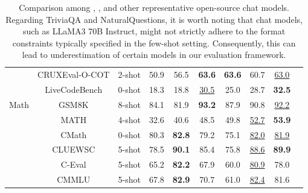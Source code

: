 \begin{table}[!t]
\begin{tabular}{@{}c c l c | cc c |c c c@{}}
    & CRUXEval-O-COT & 2-shot & 50.9 & 56.5 & \textbf{63.6} & \textbf{63.6} & 60.7 & \underline{63.0}\\
    & LiveCodeBench & 0-shot & 18.3 & 18.8 & \underline{30.5} &25.0 & 28.7 &\textbf{32.5}\\
    \midrule
    \multirow{4}{*}{Math} & GSM8K & 8-shot & 84.1 & 81.9 & \textbf{93.2} & 87.9 & 90.8 & \underline{92.2} \\
    & MATH & 4-shot & 32.6 & 40.6 & 48.5 & 49.8 & \underline{52.7}& \textbf{53.9}  \\
    & CMath & 0-shot & 80.3 & \textbf{82.8} & 79.2 & 75.1 & \underline{82.0} & \underline{81.9} \\
    \midrule
    \multirow{3}{*}{Chinese} & CLUEWSC & 5-shot & 78.5 & \textbf{90.1} & 85.4 & 75.8 & \underline{88.6} & \textbf{89.9} \\
    & C-Eval & 5-shot & 65.2 & \textbf{82.2} & 67.9 & 60.0 & \underline{80.9} & 78.0 \\
    & CMMLU & 5-shot & 67.8 & \textbf{82.9} & 70.7 & 61.0 & \underline{82.4} & 81.6 \\
    \bottomrule
    \end{tabular}
    \caption{
    Comparison among \dsviisft{}, \dsviirl{}, and other representative open-source chat models. 
    Regarding TriviaQA and NaturalQuestions, it is worth noting that chat models, such as LLaMA3 70B Instruct, might not strictly adhere to the format constraints typically specified in the few-shot setting. 
    Consequently, this can lead to underestimation of certain models in our evaluation framework.
    }
    \label{tab:sft}
\end{table}